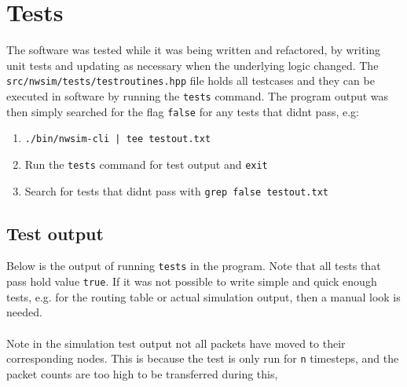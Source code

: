 \section{Tests}
The software was tested while it was being written and refactored, by writing unit tests and updating as necessary when the underlying logic changed. The \texttt{src/nwsim/tests/testroutines.hpp} file holds all testcases and they can be executed in software by running the \texttt{tests} command. The program output was then simply searched for the flag \texttt{false} for any tests that didnt pass, e.g:
\begin{enumerate}
    \item \texttt{./bin/nwsim-cli | tee testout.txt}
    \item Run the \texttt{tests} command for test output and \texttt{exit}
    \item Search for tests that didnt pass with \texttt{grep false testout.txt}
\end{enumerate}

\subsection{Test output}
Below is the output of running \texttt{tests} in the program. Note that all tests that pass hold value \texttt{true}. If it was not possible to write simple and quick enough tests, e.g. for the routing table or actual simulation output, then a manual look is needed.
\\\\
Note in the simulation test output not all packets have moved to their corresponding nodes. This is because the test is only run for \texttt{n} timesteps, and the packet counts are too high to be transferred during this,

